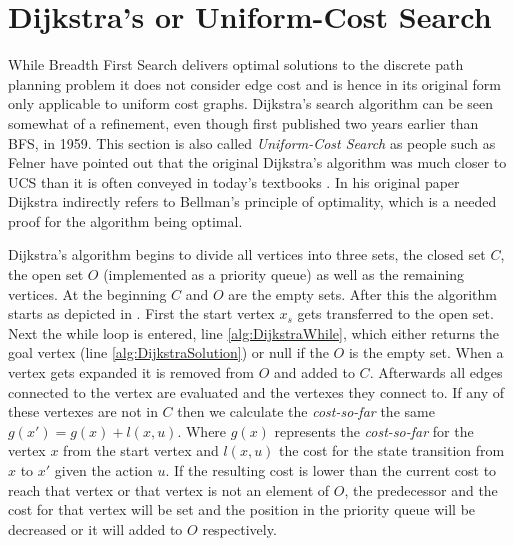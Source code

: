 \section{Dijkstra's or Uniform-Cost Search}
While Breadth First Search delivers optimal solutions to the discrete path planning problem it does not consider edge cost and is hence in its original form only applicable to uniform cost graphs. Dijkstra's search algorithm can be seen somewhat of a refinement, even though first published two years earlier than BFS, in 1959. This section is also called \emph{Uniform-Cost Search} as people such as Felner have pointed out that the original Dijkstra's algorithm was much closer to UCS than it is often conveyed in today's textbooks \cite{Felner.2011}. In his original paper Dijkstra indirectly refers to Bellman's principle of optimality, which is a needed proof for the algorithm being optimal.

Dijkstra's algorithm begins to divide all vertices into three sets, the closed set $C$, the open set $O$ (implemented as a priority queue) as well as the remaining vertices. At the beginning $C$ and $O$ are the empty sets. After this the algorithm starts as depicted in  \cite{Dijkstra.1959}. First the start vertex $x_s$ gets transferred to the open set. Next the while loop is entered, line \ref{alg:DijkstraWhile}, which either returns the goal vertex (line \ref{alg:DijkstraSolution}) or null if the $O$ is the empty set. When a vertex gets expanded it is removed from $O$ and added to $C$. Afterwards all edges connected to the vertex are evaluated and the vertexes they connect to. If any of these vertexes are not in $C$ then we calculate the \textit{cost-so-far} the same $g(x') = g(x) + l(x,u)$. Where $g(x)$ represents the \textit{cost-so-far} for the vertex $x$ from the start vertex and $l(x,u)$ the cost for the state transition from $x$ to $x'$ given the action $u$. If the resulting cost is lower than the current cost to reach that vertex or that vertex is not an element of $O$, the predecessor and the cost for that vertex will be set and the position in the priority queue will be decreased or it will added to $O$ respectively. \cite{Dijkstra.1959,LaValle.2006,Cormen.2009} 

